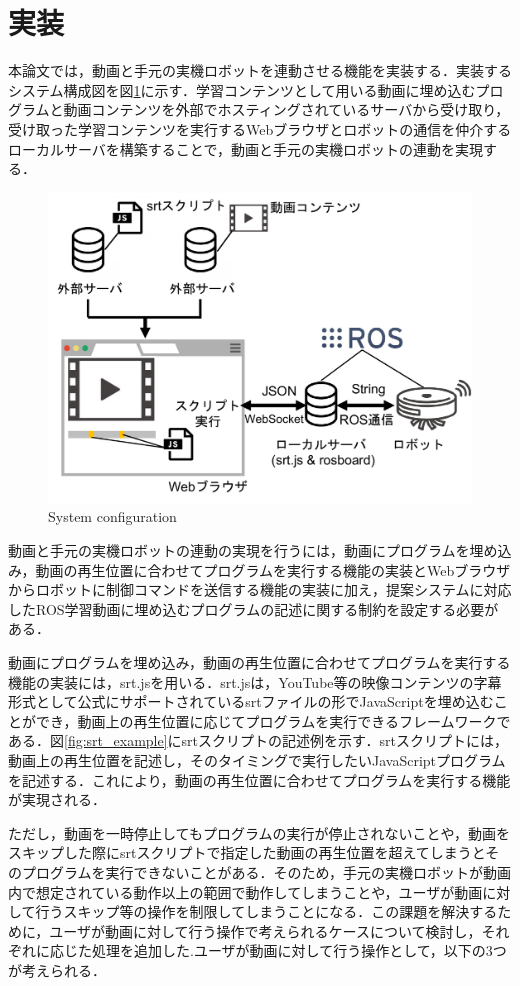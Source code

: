 \documentclass{ujarticle}
\begin{document}
\section{実装}
本論文では，動画と手元の実機ロボットを連動させる機能を実装する．実装するシステム構成図を図\ref{fig:Implemented_system}に示す．学習コンテンツとして用いる動画に埋め込むプログラムと動画コンテンツを外部でホスティングされているサーバから受け取り，受け取った学習コンテンツを実行するWebブラウザとロボットの通信を仲介するローカルサーバを構築することで，動画と手元の実機ロボットの連動を実現する．

\begin{figure}[t]
  \centering
  \includegraphics[keepaspectratio, scale=0.4]{./src/Implemented_system.pdf}
  \caption{System configuration}
  \label{fig:Implemented_system}
\end{figure}

\par 動画と手元の実機ロボットの連動の実現を行うには，動画にプログラムを埋め込み，動画の再生位置に合わせてプログラムを実行する機能の実装とWebブラウザからロボットに制御コマンドを送信する機能の実装に加え，提案システムに対応したROS学習動画に埋め込むプログラムの記述に関する制約を設定する必要がある．
\par 動画にプログラムを埋め込み，動画の再生位置に合わせてプログラムを実行する機能の実装には，srt.js\cite{srt.js}を用いる．srt.jsは，YouTube等の映像コンテンツの字幕形式として公式にサポートされているsrtファイルの形でJavaScriptを埋め込むことができ，動画上の再生位置に応じてプログラムを実行できるフレームワークである．図\ref{fig:srt_example}にsrtスクリプトの記述例を示す．srtスクリプトには，動画上の再生位置を記述し，そのタイミングで実行したいJavaScriptプログラムを記述する．これにより，動画の再生位置に合わせてプログラムを実行する機能が実現される．
\par ただし，動画を一時停止してもプログラムの実行が停止されないことや，動画をスキップした際にsrtスクリプトで指定した動画の再生位置を超えてしまうとそのプログラムを実行できないことがある．そのため，手元の実機ロボットが動画内で想定されている動作以上の範囲で動作してしまうことや，ユーザが動画に対して行うスキップ等の操作を制限してしまうことになる．この課題を解決するために，ユーザが動画に対して行う操作で考えられるケースについて検討し，それぞれに応じた処理を追加した.ユーザが動画に対して行う操作として，以下の3つが考えられる．
\end{document}
